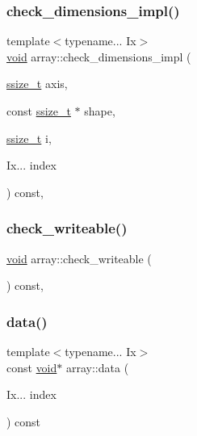 \subsubsection{\texorpdfstring{check\_dimensions\_impl()}{check\_dimensions\_impl()}\hspace{0.1cm}{\footnotesize\ttfamily [2/2]}}
{\footnotesize\ttfamily template$<$typename... Ix$>$ \\
\mbox{\hyperlink{_s_d_l__opengles2__gl2ext_8h_ae5d8fa23ad07c48bb609509eae494c95}{void}} array\+::check\+\_\+dimensions\+\_\+impl (\begin{DoxyParamCaption}\item[{\mbox{\hyperlink{detail_2common_8h_ac430d16fc097b3bf0a7469cfd09decda}{ssize\+\_\+t}}}]{axis,  }\item[{const \mbox{\hyperlink{detail_2common_8h_ac430d16fc097b3bf0a7469cfd09decda}{ssize\+\_\+t}} $\ast$}]{shape,  }\item[{\mbox{\hyperlink{detail_2common_8h_ac430d16fc097b3bf0a7469cfd09decda}{ssize\+\_\+t}}}]{i,  }\item[{Ix...}]{index }\end{DoxyParamCaption}) const\hspace{0.3cm}{\ttfamily [inline]}, {\ttfamily [protected]}}

\mbox{\label{classarray_a967db5bead19594b8f4a95c29b8aa13a}} 
\subsubsection{\texorpdfstring{check\_writeable()}{check\_writeable()}}
{\footnotesize\ttfamily \mbox{\hyperlink{_s_d_l__opengles2__gl2ext_8h_ae5d8fa23ad07c48bb609509eae494c95}{void}} array\+::check\+\_\+writeable (\begin{DoxyParamCaption}{ }\end{DoxyParamCaption}) const\hspace{0.3cm}{\ttfamily [inline]}, {\ttfamily [protected]}}

\mbox{\label{classarray_a7a8adf48e9a263af91aa975548e0e14d}} 
\subsubsection{\texorpdfstring{data()}{data()}}
{\footnotesize\ttfamily template$<$typename... Ix$>$ \\
const \mbox{\hyperlink{_s_d_l__opengles2__gl2ext_8h_ae5d8fa23ad07c48bb609509eae494c95}{void}}$\ast$ array\+::data (\begin{DoxyParamCaption}\item[{Ix...}]{index }\end{DoxyParamCaption}) const\hspace{0.3cm}{\ttfamily [inline]}}

